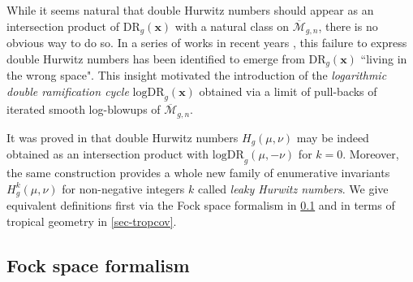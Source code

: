 \documentclass[10pt,a4paper,oneside,no-math,reqno]{amsart}%
\theoremstyle{plain}
\theoremstyle{definition}
\theoremstyle{remark}
\numberwithin{equation}{section}
\newcommand{\1}{\mathds{1}}
\newcommand{\<}{\langle}
\renewcommand{\>}{\rangle}
\begin{document}
While it seems natural that double Hurwitz numbers should appear as an intersection product of $\mathrm{DR}_g(\mathbf{x})$ with a natural class on $\overline{\mathcal{M}}_{g,n}$, there is no obvious way to do so. In a series of works in recent years \cite{Hol21,MW20}, this failure to express double Hurwitz numbers has been identified to emerge from $\mathrm{DR}_g(\mathbf{x})$ ``living in the wrong space". This insight motivated the introduction of the \textit{logarithmic double ramification cycle} $\mathrm{logDR}_g(\mathbf{x})$ obtained via a limit of pull-backs of iterated smooth log-blowups of $\overline{\mathcal{M}}_{g,n}$.

It was proved in \cite{CMR25} that double Hurwitz numbers $H_g(\mu,\nu)$ may be indeed obtained as an intersection product with $\mathrm{logDR}_g(\mu,-\nu)$ for $k=0$. Moreover, the same construction provides a whole new family of enumerative invariants $H_g^k(\mu,\nu)$ for non-negative integers $k$ called \textit{leaky Hurwitz numbers}. We give equivalent definitions first via the Fock space formalism in \cref{FockSpace} and in terms of tropical geometry in \cref{sec-tropcov}.



\subsection{Fock space formalism}\label{FockSpace}
\end{document}
